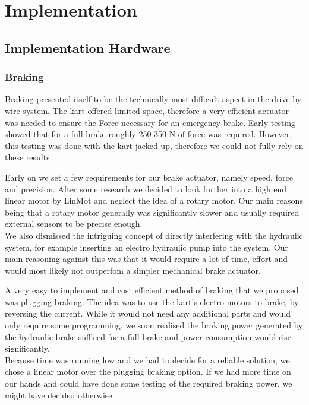 
\chapter{Implementation}
\label{chp:Implementation}

\section{Implementation Hardware}
\subsection{Braking}

Braking presented itself to be the technically most difficult aspect in the drive-by-wire system. The kart offered limited space, therefore a very efficient actuator was needed to ensure the Force necessary for an emergency brake. Early testing showed that for a full brake roughly 250-350 N of force was required. However, this testing was done with the kart jacked up, therefore we could not fully rely on these results.

Early on we set a few requirements for our brake actuator, namely speed, force and precision. After some research we decided to look further into a high end linear motor by LinMot and neglect the idea of a rotary motor. Our main reasons being that a rotary motor generally was significantly slower and usually required external sensors to be precise enough.\\
We also dismissed the intriguing concept of directly interfering with the hydraulic system, for example inserting an electro hydraulic pump into the system. Our main reasoning against this was that it would require a lot of time, effort and would most likely not outperfom a simpler mechanical brake actuator.

A very easy to implement and cost efficient method of braking that we proposed was plugging braking. The idea was to use the kart's electro motors to brake, by reversing the current. While it would not need any additional parts and would only require some programming, we soon realised the braking power generated by the hydraulic brake sufficed for a full brake and power consumption would rise significantly. \\Because time was running low and we had to decide for a reliable solution, we chose a linear motor over the plugging braking option. If we had more time on our hands and could have done some testing of the required braking power, we might have decided otherwise.

